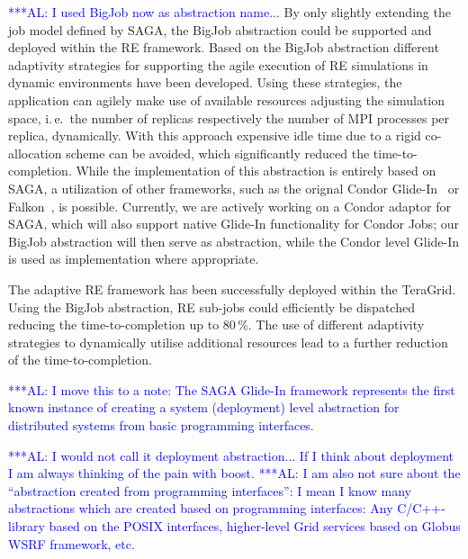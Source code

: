 \documentclass{rspublic}
\newcommand{\alnote}[1]{ {\textcolor{blue} { ***AL: #1 }}}
\newcommand{\alnote}[1]{}
\newcommand{\glidein}[1]{Glide-In }
\begin{document}
\alnote{I used BigJob now as abstraction name...}
By only slightly extending the job model defined by SAGA, the BigJob 
abstraction could be supported and deployed within the RE framework.  
Based on the BigJob abstraction different adaptivity strategies for
supporting the agile execution of RE simulations in dynamic
environments have been developed. Using these strategies, the
application can agilely make use of available resources adjusting the
simulation space, i.\,e.\ the number of replicas respectively the
number of MPI processes per replica, dynamically.  With this approach
expensive idle time due to a rigid co-allocation scheme can be
avoided, which significantly reduced the time-to-completion.  While
the implementation of this abstraction is entirely based on SAGA, a
utilization of other frameworks, such as the orignal Condor
Glide-In~\citep{citeulike:291860} or Falkon~\citep{1362680}, is
possible. Currently, we are actively working on a Condor adaptor for
SAGA, which will also support native Glide-In functionality for Condor
Jobs; our BigJob abstraction will then serve as abstraction, while the
Condor level Glide-In is used as implementation where appropriate.

The adaptive RE framework has been successfully deployed within 
the TeraGrid. 
Using the BigJob abstraction, RE sub-jobs could efficiently be dispatched 
reducing the time-to-completion up to 80\,\%. The use of different 
adaptivity strategies to dynamically utilise additional resources lead 
to a further reduction of the time-to-completion.




\alnote{I move this to a note:
The SAGA \glidein\ framework represents the first known instance of creating a
system (deployment) level abstraction for distributed systems from
basic programming interfaces.} 

\alnote{I would not call it deployment abstraction... If I think about
deployment I am always thinking of the pain with boost.}
\alnote{I am also not sure about the ``abstraction created from 
  programming interfaces'': 
  I mean I know many abstractions which are created based on
  programming interfaces: Any C/C++-library based on the POSIX
  interfaces, higher-level Grid services based on Globus WSRF
  framework, etc.}   
\end{document}
